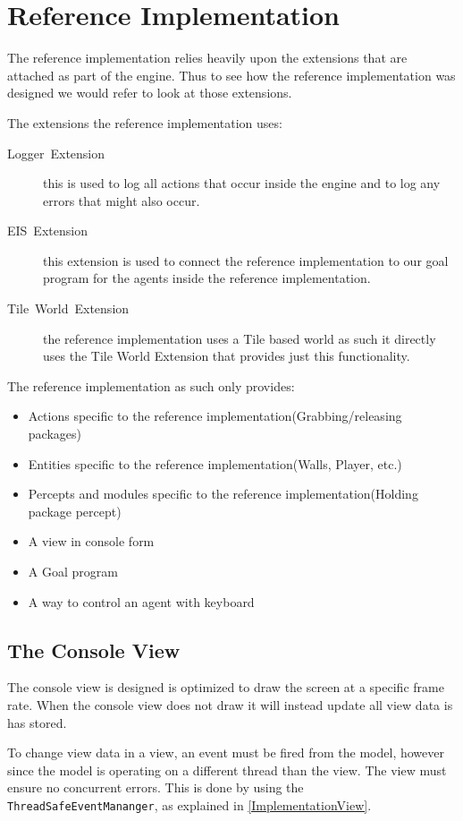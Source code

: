 
\section{Reference Implementation\label{sec:ImplementationReferenceImplementation}}

The reference implementation relies heavily upon the extensions that
are attached as part of the engine. Thus to see how the reference
implementation was designed we would refer to look at those extensions.

The extensions the reference implementation uses:
\begin{description}
\item [{Logger~Extension}] this is used to log all actions that occur
inside the engine and to log any errors that might also occur.
\item [{EIS~Extension}] this extension is used to connect the reference
implementation to our goal program for the agents inside the reference
implementation.
\item [{Tile~World~Extension}] the reference implementation uses a Tile
based world as such it directly uses the Tile World Extension that
provides just this functionality.
\end{description}
The reference implementation as such only provides:
\begin{itemize}
\item Actions specific to the reference implementation(Grabbing/releasing
packages)
\item Entities specific to the reference implementation(Walls, Player, etc.)
\item Percepts and modules specific to the reference implementation(Holding
package percept)
\item A view in console form
\item A Goal program
\item A way to control an agent with keyboard
\end{itemize}

\subsection{The Console View}

The console view is designed is optimized to draw the screen at a
specific frame rate. When the console view does not draw it will instead
update all view data is has stored.

To change view data in a view, an event must be fired from the model,
however since the model is operating on a different thread than the
view. The view must ensure no concurrent errors. This is done by using
the \texttt{ThreadSafeEventMananger}, as explained in \ref{ImplementationView}.

